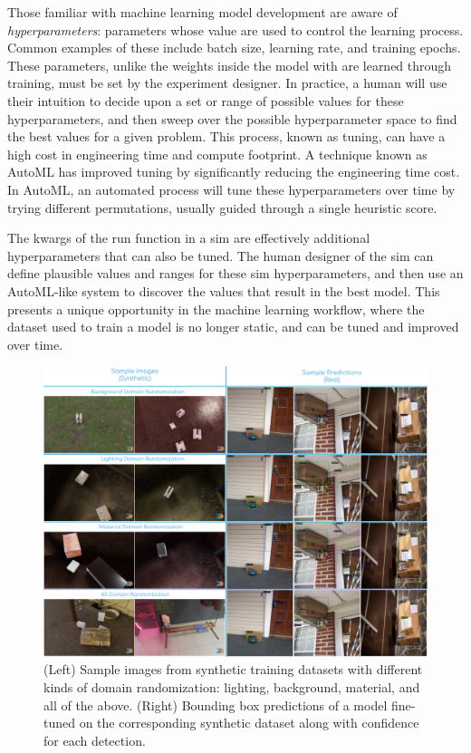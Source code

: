 \documentclass{article}
\begin{document}
Those familiar with machine learning model development are aware of \emph{hyperparameters}: parameters whose value are used to control the learning process. Common examples of these include batch size, learning rate, and training epochs. These parameters, unlike the weights inside the model with are learned through training, must be set by the experiment designer. In practice, a human will use their intuition to decide upon a set or range of possible values for these hyperparameters, and then sweep over the possible hyperparameter space to find the best values for a given problem. This process, known as tuning, can have a high cost in engineering time and compute footprint. A technique known as AutoML has improved tuning by significantly reducing the engineering time cost. In AutoML, an automated process will tune these hyperparameters over time by trying different permutations, usually guided through a single heuristic score.

The kwargs of the run function in a sim are effectively additional hyperparameters that can also be tuned. The human designer of the sim can define plausible values and ranges for these sim hyperparameters, and then use an AutoML-like system to discover the values that result in the best model. This presents a unique opportunity in the machine learning workflow, where the dataset used to train a model is no longer static, and can be tuned and improved over time.

\begin{figure}
	\centering
	\includegraphics[width=\textwidth]{results.png}
	\caption{(Left) Sample images from synthetic training datasets with different kinds of domain randomization: lighting, background, material, and all of the above. (Right) Bounding box predictions of a model fine-tuned on the corresponding synthetic dataset along with confidence for each detection.}
	\label{fig:results}
\end{figure}
\end{document}
